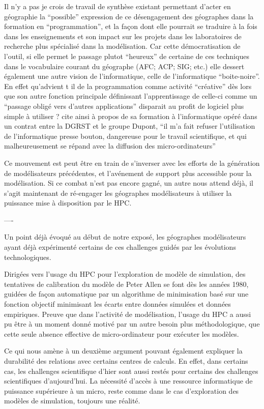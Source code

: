 Il n’y a pas je crois de travail de synthèse existant permettant d'acter en géographie la “possible” expression de ce désengagement des géographes dans la formation en “programmation”, et la façon dont elle pourrait se traduire à la fois dans les enseignements et son impact sur les projets dans les laboratoires de recherche plus spécialisé dans la modélisation. Car cette démocratisation de l’outil, si elle permet le passage  plutot \enquote{heureux} de certaine de ces techniques dans le vocabulaire courant du géographe (AFC; ACP; SIG; etc.) \autocite{Pumain2002} elle dessert également une autre vision de l'informatique, celle de l'informatique \enquote{boite-noire}. En effet qu’advient t il de la programmation comme activité “créative” dès lors que son autre fonction principale définissant l’apprentissage de celle-ci comme un \enquote{passage obligé vers d’autres applications} disparait au profit de logiciel plus simple à utiliser ? \textcite[4]{LeBerre1987} cite ainsi à propos de sa formation à l’informatique opéré dans un contrat entre la DGRST et le groupe Dupont, \enquote{il m’a fait refuser l’utilisation de l’informatique presse bouton, dangereuse pour le travail scientifique, et qui malheureusement se répand avec la diffusion des micro-ordinateurs}

Ce mouvement est peut être en train de s'inverser avec les efforts de la génération de modélisateurs précédentes, et l'avénement de support plus accessible pour la modélisation. Si ce combat n'est pas encore gagné, un autre nous attend déjà, il s'agit maintenant de ré-engager les géographes modélisateurs à utiliser la puissance mise à disposition par le HPC.




----

Un point déjà évoqué au début de notre exposé, les géographes modélisateurs ayant déjà expérimenté certains de ces challenges guidés par les évolutions technologiques. 

Dirigées vers l'usage du HPC pour l'exploration de modèle de simulation, des tentatives de calibration du modèle de Peter Allen se font dès les années 1980, guidées de façon automatique par un algorithme de minimisation basé sur une fonction objectif minimisant les écarts entre données simulées et données empiriques. Preuve que dans l'activité de modélisation, l'usage du HPC a aussi pu être à un moment donné motivé par un autre besoin plus méthodologique, que cette seule absence effective de micro-ordinateur pour exécuter les modèles.

Ce qui nous amène à un deuxième argument pouvant également expliquer la durabilité des relations avec certains centres de calculs. En effet, dans certains cas, les challenges scientifique d'hier sont aussi restés pour certains des challenges scientifiques d'aujourd'hui. La nécessité d'accès à une ressource informatique de puissance supérieure à un micro, reste comme dans le cas d'exploration des modèles de simulation, toujours une réalité.


